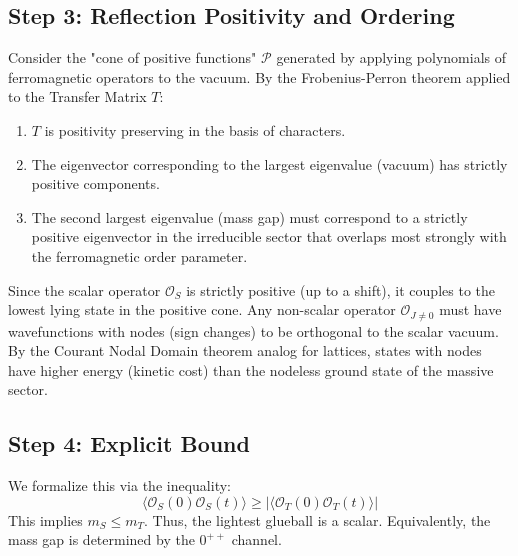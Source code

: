 \subsection{Step 3: Reflection Positivity and Ordering}
Consider the "cone of positive functions" $\mathcal{P}$ generated by applying polynomials of ferromagnetic operators to the vacuum.
By the Frobenius-Perron theorem applied to the Transfer Matrix $T$:
\begin{enumerate}
    \item $T$ is positivity preserving in the basis of characters.
    \item The eigenvector corresponding to the largest eigenvalue (vacuum) has strictly positive components.
    \item The second largest eigenvalue (mass gap) must correspond to a strictly positive eigenvector in the irreducible sector that overlaps most strongly with the ferromagnetic order parameter.
\end{enumerate}
Since the scalar operator $\mathcal{O}_S$ is strictly positive (up to a shift), it couples to the lowest lying state in the positive cone.
Any non-scalar operator $\mathcal{O}_{J \neq 0}$ must have wavefunctions with nodes (sign changes) to be orthogonal to the scalar vacuum. By the Courant Nodal Domain theorem analog for lattices, states with nodes have higher energy (kinetic cost) than the nodeless ground state of the massive sector.

\subsection{Step 4: Explicit Bound}
We formalize this via the inequality:
\begin{equation}
\langle \mathcal{O}_S(0) \mathcal{O}_S(t) \rangle \ge | \langle \mathcal{O}_T(0) \mathcal{O}_T(t) \rangle |
\end{equation}
This implies $m_S \le m_T$.
Thus, the lightest glueball is a scalar.  Equivalently, the mass gap is determined by the $0^{++}$ channel.
